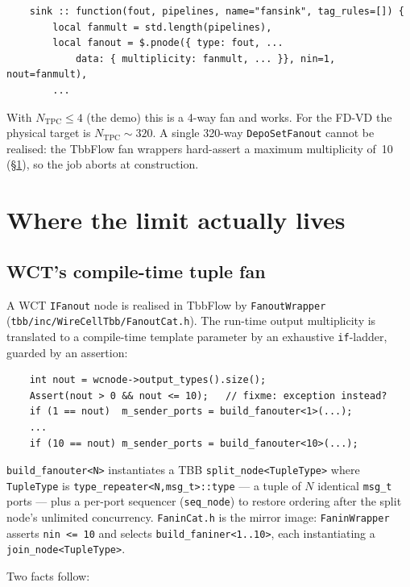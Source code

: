 \documentclass[11pt]{article}
\newcommand{\code}[1]{\texttt{#1}}
\newcommand{\file}[1]{\texttt{\small #1}}
\begin{document}
\begin{verbatim}
    sink :: function(fout, pipelines, name="fansink", tag_rules=[]) {
        local fanmult = std.length(pipelines),
        local fanout = $.pnode({ type: fout, ...
            data: { multiplicity: fanmult, ... }}, nin=1, nout=fanmult),
        ...
\end{verbatim}

\noindent
With $N_{\mathrm{TPC}}\le 4$ (the demo) this is a 4-way fan and works.  For the
FD-VD the physical target is $N_{\mathrm{TPC}}\sim 320$.  A single 320-way
\code{DepoSetFanout} cannot be realised: the TbbFlow fan wrappers hard-assert a
maximum multiplicity of~10 (\S\ref{sec:background}), so the job aborts at
construction.

\section{Where the limit actually lives}
\label{sec:background}

\subsection{WCT's compile-time tuple fan}

A WCT \code{IFanout} node is realised in TbbFlow by \code{FanoutWrapper}
(\file{tbb/inc/WireCellTbb/FanoutCat.h}).  The run-time output multiplicity is
translated to a compile-time template parameter by an exhaustive
\code{if}-ladder, guarded by an assertion:

\begin{verbatim}
    int nout = wcnode->output_types().size();
    Assert(nout > 0 && nout <= 10);   // fixme: exception instead?
    if (1 == nout)  m_sender_ports = build_fanouter<1>(...);
    ...
    if (10 == nout) m_sender_ports = build_fanouter<10>(...);
\end{verbatim}

\noindent
\code{build\_fanouter<N>} instantiates a TBB \code{split\_node<TupleType>} where
\code{TupleType} is \code{type\_repeater<N,msg\_t>::type} --- a tuple of $N$
identical \code{msg\_t} ports --- plus a per-port sequencer (\code{seq\_node}) to
restore ordering after the split node's unlimited concurrency.  \code{FaninCat.h}
is the mirror image: \code{FaninWrapper} asserts \code{nin <= 10} and selects
\code{build\_faniner<1..10>}, each instantiating a \code{join\_node<TupleType>}.

Two facts follow:
\end{document}
